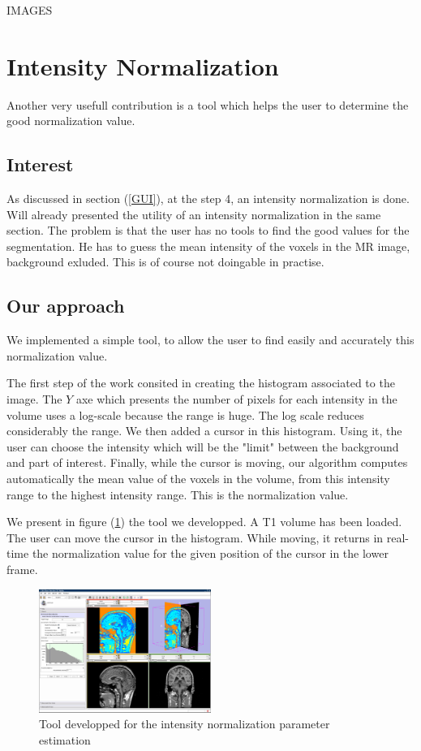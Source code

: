IMAGES

\section{Intensity Normalization}
Another very usefull contribution is a tool which helps the user to determine the good normalization value.
\subsection{Interest}
As discussed in section (\ref{GUI}), at the step 4, an intensity normalization is done. Will already presented the utility of an intensity normalization in the same section. The problem is that the user has no tools to find the good values for the segmentation. He has to guess the mean intensity of the voxels in the MR image, background exluded. This is of course not doingable in practise.
\subsection{Our approach}
We implemented a simple tool, to allow the user to find easily and accurately this normalization value.
\par
The first step of the work consited in creating the histogram associated to the image. The $Y$ axe which presents the number of pixels for each intensity in the volume uses a log-scale because the range is huge. The log scale reduces considerably the range. We then added a cursor in this histogram. Using it, the user can choose the intensity which will be the "limit" between the background and part of interest. Finally, while the cursor is moving, our algorithm computes automatically the mean value of the voxels in the volume, from this intensity range to the highest intensity range. This is the normalization value.
\par
We present in figure (\ref{fig:intensitynormalization}) the tool we developped. A T1 volume has been loaded. The user can move the cursor in the histogram. While moving, it returns in real-time the normalization value for the given position of the cursor in the lower frame.

\begin{figure}\centering
  \includegraphics[width=0.5\textwidth]{Images/Screenshots/intensityNormalization.png}
  \caption{Tool developped for the intensity normalization parameter estimation}\label{fig:intensitynormalization}
\end{figure}
%


